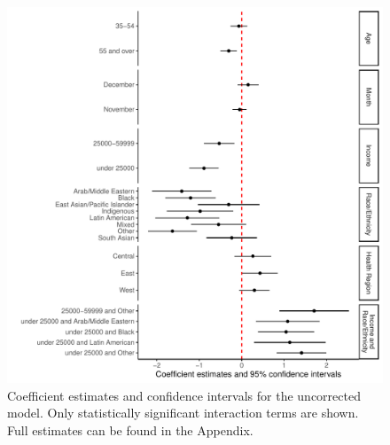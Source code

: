 \documentclass[
  letterpaper,
  DIV=11,
  numbers=noendperiod]{scrartcl}
\begin{document}
\begin{figure}

\includegraphics{main_files/figure-pdf/fig-model-uncorr-1.pdf} \hfill{}

\caption{\label{fig-model-uncorr}Coefficient estimates and confidence
intervals for the uncorrected model. Only statistically significant
interaction terms are shown. Full estimates can be found in the
Appendix.}

\end{figure}
\end{document}
